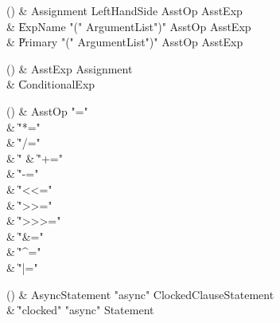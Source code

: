 \begin{bbgrammarappendix}

() & Assignment \label{prod:Assignment}  \: LeftHandSide AsstOp AsstExp  \\

 &    \| ExpName  \xcd"(" ArgumentList\opt \xcd")" AsstOp AsstExp \\
 &    \| Primary  \xcd"(" ArgumentList\opt \xcd")" AsstOp AsstExp \\

\end{bbgrammarappendix}

\begin{bbgrammarappendix}

() & AsstExp \label{prod:AsstExp}  \: Assignment  \\

 &    \| ConditionalExp \\

\end{bbgrammarappendix}

\begin{bbgrammarappendix}

() & AsstOp \label{prod:AsstOp}  \: \xcd"="  \\

 &    \| \xcd"*=" \\
 &    \| \xcd"/=" \\
 &    \| \xcd"%
 &    \| \xcd"+=" \\
 &    \| \xcd"-=" \\
 &    \| \xcd"<<=" \\
 &    \| \xcd">>=" \\
 &    \| \xcd">>>=" \\
 &    \| \xcd"&=" \\
 &    \| \xcd"^=" \\
 &    \| \xcd"|=" \\

\end{bbgrammarappendix}

\begin{bbgrammarappendix}

() & AsyncStatement \label{prod:AsyncStatement}  \: \xcd"async" ClockedClause\opt Statement  \\

 &    \| \xcd"clocked" \xcd"async" Statement \\

\end{bbgrammarappendix}

